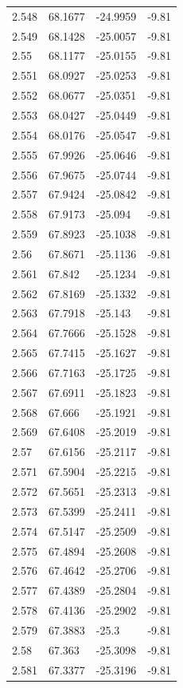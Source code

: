 \begin{tabular}{llll}
2.548 & 68.1677 & -24.9959 & -9.81 \\
2.549 & 68.1428 & -25.0057 & -9.81 \\
2.55 & 68.1177 & -25.0155 & -9.81 \\
2.551 & 68.0927 & -25.0253 & -9.81 \\
2.552 & 68.0677 & -25.0351 & -9.81 \\
2.553 & 68.0427 & -25.0449 & -9.81 \\
2.554 & 68.0176 & -25.0547 & -9.81 \\
2.555 & 67.9926 & -25.0646 & -9.81 \\
2.556 & 67.9675 & -25.0744 & -9.81 \\
2.557 & 67.9424 & -25.0842 & -9.81 \\
2.558 & 67.9173 & -25.094 & -9.81 \\
2.559 & 67.8923 & -25.1038 & -9.81 \\
2.56 & 67.8671 & -25.1136 & -9.81 \\
2.561 & 67.842 & -25.1234 & -9.81 \\
2.562 & 67.8169 & -25.1332 & -9.81 \\
2.563 & 67.7918 & -25.143 & -9.81 \\
2.564 & 67.7666 & -25.1528 & -9.81 \\
2.565 & 67.7415 & -25.1627 & -9.81 \\
2.566 & 67.7163 & -25.1725 & -9.81 \\
2.567 & 67.6911 & -25.1823 & -9.81 \\
2.568 & 67.666 & -25.1921 & -9.81 \\
2.569 & 67.6408 & -25.2019 & -9.81 \\
2.57 & 67.6156 & -25.2117 & -9.81 \\
2.571 & 67.5904 & -25.2215 & -9.81 \\
2.572 & 67.5651 & -25.2313 & -9.81 \\
2.573 & 67.5399 & -25.2411 & -9.81 \\
2.574 & 67.5147 & -25.2509 & -9.81 \\
2.575 & 67.4894 & -25.2608 & -9.81 \\
2.576 & 67.4642 & -25.2706 & -9.81 \\
2.577 & 67.4389 & -25.2804 & -9.81 \\
2.578 & 67.4136 & -25.2902 & -9.81 \\
2.579 & 67.3883 & -25.3 & -9.81 \\
2.58 & 67.363 & -25.3098 & -9.81 \\
2.581 & 67.3377 & -25.3196 & -9.81 \\

\end{tabular}
